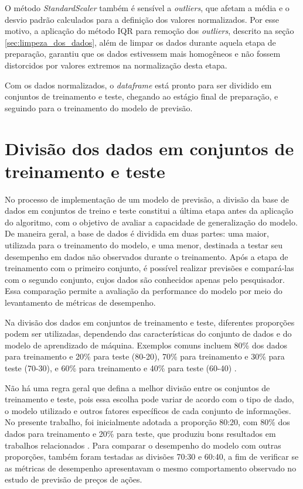 O método \textit{StandardScaler} também é sensível a \textit{outliers}, que afetam a média e o desvio padrão calculados para a definição dos valores normalizados. Por esse motivo, a aplicação do método \gls{IQR} para remoção dos \textit{outliers}, descrito na seção \ref{sec:limpeza_dos_dados}, além de limpar os dados durante aquela etapa de preparação, garantiu que os dados estivessem mais homogêneos e não fossem distorcidos por valores extremos na normalização desta etapa.

Com os dados normalizados, o \textit{dataframe} está pronto para ser dividido em conjuntos de treinamento e teste, chegando ao estágio final de preparação, e seguindo para o treinamento do modelo de previsão. 

\section{Divisão dos dados em conjuntos de treinamento e teste}

No processo de implementação de um modelo de previsão, a divisão da base de dados em conjuntos de treino e teste constitui a última etapa antes da aplicação do algoritmo, com o objetivo de avaliar a capacidade de generalização do modelo. De maneira geral, a base de dados é dividida em duas partes: uma maior, utilizada para o treinamento do modelo, e uma menor, destinada a testar seu desempenho em dados não observados durante o treinamento. Após a etapa de treinamento com o primeiro conjunto, é possível realizar previsões e compará-las com o segundo conjunto, cujos dados são conhecidos apenas pelo pesquisador. Essa comparação permite a avaliação da performance do modelo por meio do levantamento de métricas de desempenho.

Na divisão dos dados em conjuntos de treinamento e teste, diferentes proporções podem ser utilizadas, dependendo das características do conjunto de dados e do modelo de aprendizado de máquina. Exemplos comuns incluem 80\% dos dados para treinamento e 20\% para teste (80-20), 70\% para treinamento e 30\% para teste (70-30), e 60\% para treinamento e 40\% para teste (60-40) \cite{supri2023asian}.

Não há uma regra geral que defina a melhor divisão entre os conjuntos de treinamento e teste, pois essa escolha pode variar de acordo com o tipo de dado, o modelo utilizado e outros fatores específicos de cada conjunto de informações. No presente trabalho, foi inicialmente adotada a proporção 80:20, com 80\% dos dados para treinamento e 20\% para teste, que produziu bons resultados em trabalhos relacionados \cite{supri2023asian}. Para comparar o desempenho do modelo com outras proporções, também foram testadas as divisões 70:30 e 60:40, a fim de verificar se as métricas de desempenho apresentavam o mesmo comportamento observado no estudo de previsão de preços de ações.


